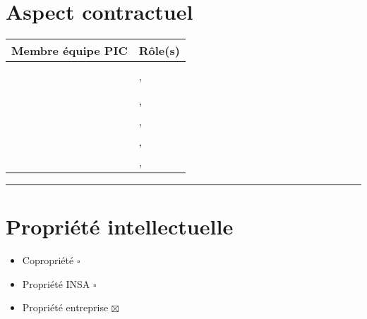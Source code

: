 	\section*{Aspect contractuel}
	
	
	\begin{tabular}[h]{|p{}|p{}|}
	\hline
	\cellcolor{gray!40}Membre équipe PIC & \cellcolor{gray!40}Rôle(s) \\\hline
	\Pierre & \CP \\\hline
	\Francois & \CPA , \D \\\hline 
	\Kafui  & \RQ \\\hline
	\Matthieu & \D , \RRS \\\hline
	\Florian & \D , \RS \\\hline
	\Melissa  & \D , \RGC \\\hline
	\Julie & \D , \RD \\\hline
\end{tabular}
	
	\vspace{1cm}
	\noindent\hfil\rule{\textwidth}{.4pt}\hfil
	\vspace{1cm}	
	
	\section*{Propriété intellectuelle}
		\begin{itemize}
			\item Copropriété $\square$
			\item Propriété INSA $\square$
			\item Propriété entreprise $\boxtimes$
		\end{itemize}
	
		
